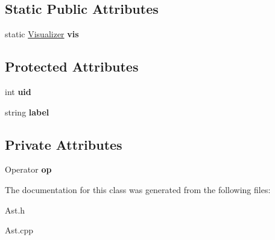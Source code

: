 \subsection*{Static Public Attributes}
\begin{DoxyCompactItemize}
\item 
\hypertarget{classAST_aca9e6637209b31e03a09c0d42f29bdfa}{static \hyperlink{classVisualizer}{Visualizer} {\bfseries vis}}\label{classAST_aca9e6637209b31e03a09c0d42f29bdfa}

\end{DoxyCompactItemize}
\subsection*{Protected Attributes}
\begin{DoxyCompactItemize}
\item 
\hypertarget{classAST_a847b778f1c3dd5a19de32de432ee6e15}{int {\bfseries uid}}\label{classAST_a847b778f1c3dd5a19de32de432ee6e15}

\item 
\hypertarget{classAST_ab2e239ccc0688d2341724432ff5a1a31}{string {\bfseries label}}\label{classAST_ab2e239ccc0688d2341724432ff5a1a31}

\end{DoxyCompactItemize}
\subsection*{Private Attributes}
\begin{DoxyCompactItemize}
\item 
\hypertarget{classAstUnaryOp_af64ad21f350c4f1a4cfc24c6bc5e992a}{Operator {\bfseries op}}\label{classAstUnaryOp_af64ad21f350c4f1a4cfc24c6bc5e992a}

\end{DoxyCompactItemize}


The documentation for this class was generated from the following files\-:\begin{DoxyCompactItemize}
\item 
Ast.\-h\item 
Ast.\-cpp\end{DoxyCompactItemize}
